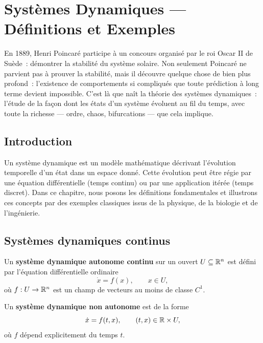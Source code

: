 \chapter{Syst\`emes Dynamiques --- D\'efinitions et Exemples}
\label{ch:definitions}

En 1889, Henri Poincar\'e participe \`a un concours organis\'e par le roi Oscar
II de Su\`ede~: d\'emontrer la stabilit\'e du syst\`eme solaire. Non seulement
Poincar\'e ne parvient pas \`a prouver la stabilit\'e, mais il d\'ecouvre
quelque chose de bien plus profond~: l'existence de comportements si
compliqu\'es que toute pr\'ediction \`a long terme devient impossible. C'est
l\`a que na\^it la th\'eorie des syst\`emes dynamiques~: l'\'etude de la
fa\c{c}on dont les \'etats d'un syst\`eme \'evoluent au fil du temps, avec
toute la richesse --- ordre, chaos, bifurcations --- que cela implique.

\section{Introduction}

Un syst\`eme dynamique est un mod\`ele math\'ematique d\'ecrivant l'\'evolution
temporelle d'un \'etat dans un espace donn\'e. Cette \'evolution peut \^etre
r\'egie par une \'equation diff\'erentielle (temps continu) ou par une
application it\'er\'ee (temps discret). Dans ce chapitre, nous posons les
d\'efinitions fondamentales et illustrons ces concepts par des exemples
classiques issus de la physique, de la biologie et de l'ing\'enierie.

\section{Syst\`emes dynamiques continus}

\begin{definition}
Un \textbf{syst\`eme dynamique autonome continu} sur un ouvert
$U \subseteq \mathbb{R}^n$ est d\'efini par l'\'equation diff\'erentielle ordinaire
\[
    \dot{x} = f(x), \qquad x \in U,
\]
o\`u $f : U \to \mathbb{R}^n$ est un champ de vecteurs au moins de classe $C^1$.
\end{definition}

\begin{definition}
Un \textbf{syst\`eme dynamique non autonome} est de la forme
\[
    \dot{x} = f(t, x), \qquad (t, x) \in \mathbb{R} \times U,
\]
o\`u $f$ d\'epend explicitement du temps $t$.
\end{definition}

